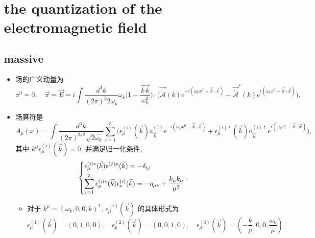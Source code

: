 \chapter{the quantization of the electromagnetic field}
\section{massive}
\begin{itemize}
	\item 场的广义动量为
	\begin{equation}
		\pi^0 = 0, \quad \vec{\pi} = \vec{E} = i \int \frac{d^3 k}{(2 \pi)^3 2 \omega_k} \omega_k \Big( 1 - \frac{\vec{k} \vec{k}}{\omega_k^2} \Big) \cdot \Big( \vec{\tilde{\mathcal{A}}}(k) e^{- i (\omega_k x^0 - \vec{k} \cdot \vec{x})} - \vec{\tilde{\mathcal{A}}}^*(k) e^{i (\omega_k x^0 - \vec{k} \cdot \vec{x})} \Big).
	\end{equation}
	
	\item 场算符是
	\begin{equation}
		A_\mu(x) = \int \frac{d^3 k}{(2 \pi)^{3 / 2} \sqrt{2 \omega_k}} \sum_{i = 1}^3 \Big( \epsilon^{(i)}_\mu(\vec{k}) a^{(i)}_{\vec{k}} e^{- i (\omega_k x^0 - \vec{k} \cdot \vec{x})} + \epsilon^{(i) *}_\mu(\vec{k}) a^{(i) \dag}_{\vec{k}} e^{i (\omega_k x^0 - \vec{k} \cdot \vec{x})} \Big),
	\end{equation}
	其中 $k^\mu \epsilon^{(i)}_\mu(\vec{k}) = 0$, 并满足归一化条件,
	\begin{equation}
		\begin{dcases}
			\epsilon^{(i) *}_\mu(\vec{k}) \epsilon^{(j) \mu}(\vec{k}) = - \delta_{i j} \\
			\sum_{i = 1}^3 \epsilon^{(i) *}_\mu(\vec{k}) \epsilon^{(i)}_\nu(\vec{k}) = - \eta_{\mu \nu} + \frac{k_\mu k_\nu}{\mu^2}
		\end{dcases}.
	\end{equation}
	\begin{itemize}
		\item 对于 $k^\mu = (\omega_k, 0, 0, k)^T$, $\epsilon^{(i)}_\mu(\vec{k})$ 的具体形式为
		\begin{equation}
			\epsilon^{(1)}_\mu(\vec{k}) = (0, 1, 0, 0), \quad \epsilon^{(2)}_\mu(\vec{k}) = (0, 0, 1, 0), \quad \epsilon^{(3)}_\mu(\vec{k}) = (- \frac{k}{\mu}, 0, 0, \frac{\omega_k}{\mu}).
		\end{equation}
		

\end{itemize}
\end{itemize}
